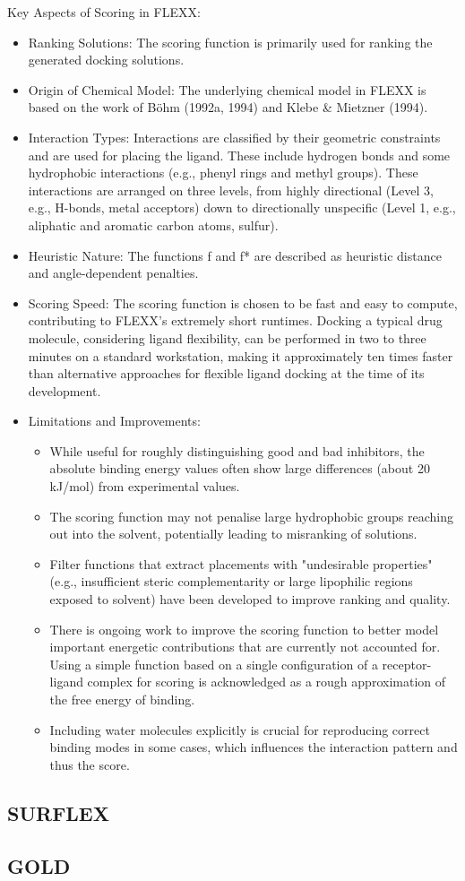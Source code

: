 \documentclass[11pt]{article}
\begin{document}
Key Aspects of Scoring in FLEXX:
\begin{itemize}
\item Ranking Solutions: The scoring function is primarily used for ranking the generated docking solutions.
\item Origin of Chemical Model: The underlying chemical model in FLEXX is based on the work of Böhm (1992a, 1994) and Klebe & Mietzner (1994).
\item Interaction Types: Interactions are classified by their geometric constraints and are used for placing the ligand. These include hydrogen bonds and some hydrophobic interactions (e.g., phenyl rings and methyl groups). These interactions are arranged on three levels, from highly directional (Level 3, e.g., H-bonds, metal acceptors) down to directionally unspecific (Level 1, e.g., aliphatic and aromatic carbon atoms, sulfur).
\item Heuristic Nature: The functions f and f* are described as heuristic distance and angle-dependent penalties.
\item Scoring Speed: The scoring function is chosen to be fast and easy to compute, contributing to FLEXX's extremely short runtimes. Docking a typical drug molecule, considering ligand flexibility, can be performed in two to three minutes on a standard workstation, making it approximately ten times faster than alternative approaches for flexible ligand docking at the time of its development.
\item Limitations and Improvements:
\begin{itemize}
    \item While useful for roughly distinguishing good and bad inhibitors, the absolute binding energy values often show large differences (about 20 kJ/mol) from experimental values.
    \item The scoring function may not penalise large hydrophobic groups reaching out into the solvent, potentially leading to misranking of solutions.
    \item Filter functions that extract placements with "undesirable properties" (e.g., insufficient steric complementarity or large lipophilic regions exposed to solvent) have been developed to improve ranking and quality.
    \item There is ongoing work to improve the scoring function to better model important energetic contributions that are currently not accounted for. Using a simple function based on a single configuration of a receptor-ligand complex for scoring is acknowledged as a rough approximation of the free energy of binding.
    \item Including water molecules explicitly is crucial for reproducing correct binding modes in some cases, which influences the interaction pattern and thus the score.
\end{itemize}
\end{itemize}

\subsection*{SURFLEX}

\subsection*{GOLD}

\printbibliography
%
\end{document}
